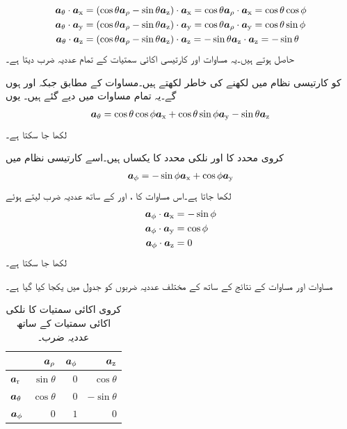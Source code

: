 \begin{gather}
\begin{aligned}\label{مساوات_سمتیہ_کروی_تھیٹا_کے_کارتیسی_اجزاء}
\atheta \cdot \ax&=(\cos \theta \arho-\sin \theta \az) \cdot \ax=\cos \theta \arho \cdot \ax=\cos \theta \cos \phi\\
\atheta \cdot \ay&=(\cos \theta \arho-\sin \theta \az) \cdot \ay=\cos \theta \arho \cdot \ay=\cos \theta \sin \phi \\
\atheta \cdot \az&=(\cos \theta \arho-\sin \theta \az) \cdot \az=-\sin \theta \az \cdot \az=-\sin \theta
\end{aligned}
\end{gather}
حاصل ہوتے ہیں۔یہ مساوات  اور کارتیسی اکائی سمتیات کے تمام عددیہ ضرب دیتا ہے۔

 کو کارتیسی نظام میں لکھنے کی خاطر  لکھتے ہیں۔مساوات  کے مطابق  جبکہ  اور  ہوں گے۔یہ تمام  مساوات  میں دیے گئے ہیں۔ یوں
\begin{align}
\atheta=\cos \theta \cos \phi \ax+\cos \theta \sin \phi\ay-\sin \theta\az
\end{align}  
لکھا جا سکتا ہے۔

کروی  محدد کا  اور نلکی محدد کا  یکساں ہیں۔اسے کارتیسی نظام میں
\begin{align}
\aphi=-\sin \phi \ax+\cos \phi \ay
\end{align} 
لکھا جاتا ہے۔اس مساوات کا ،  اور  کے ساتھ عددیہ ضرب لیتے ہوئے
\begin{gather}
\begin{aligned}
\aphi \cdot \ax&=-\sin \phi\\
\aphi \cdot \ay&=\cos \phi\\
\aphi \cdot \az&=0
\end{aligned}
\end{gather}
لکھا جا سکتا ہے۔

مساوات  اور مساوات  کے نتائج کے ساتھ  کے مختلف عددیہ ضربوں کو جدول  میں یکجا کیا گیا ہے۔

\begin{table}
\caption{کروی  اکائی سمتیات کا نلکی اکائی سمتیات کے ساتھ عددیہ ضرب۔}
\centering
\begin{tabular}{l | r r r}
 & $\arho$ & $\aphi$ & $\az$ \\
\hline
$\ar$ & $\sin \theta$ & $0$& $\cos \theta$\\
$\atheta$ &$\cos \theta$ &$ 0$ &$ -\sin \theta$\\
$\aphi$ & $0$ &$ 1$ &$0$
\end{tabular}
\label{جدول_سمتیہ_کروی_نلکی_اکائی_غیر-سمتی_ضرب}
\end{table}
%

